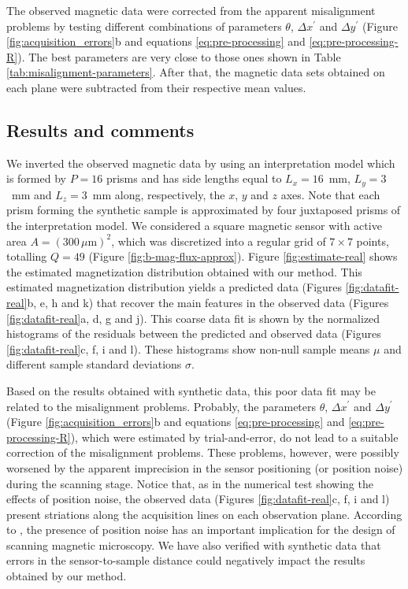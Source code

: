 \documentclass[galley,gc]{agutex}
\begin{document}
\begin{article}
The observed magnetic data were corrected from the apparent misalignment 
problems by testing different combinations of parameters $\theta$, 
$\Delta x^{\prime}$ and $\Delta y^{\prime}$ 
(Figure \ref{fig:acquisition_errors}b and equations \ref{eq:pre-processing} 
and \ref{eq:pre-processing-R}). The best parameters are very close to 
those ones shown in Table \ref{tab:misalignment-parameters}. After that, 
the magnetic data sets obtained on each plane were subtracted from their 
respective mean values.

\subsection{Results and comments}
\label{subsec:Results and comments}

We inverted the observed magnetic data by using an
interpretation model which is formed by $P = 16$ prisms
and has side lengths equal to $L_{x} = 16$~mm, $L_{y} = 3$~mm 
and $L_{z} = 3$~mm along, respectively, the $x$, $y$ and 
$z$ axes.
Note that each prism forming the synthetic sample is 
approximated by four juxtaposed prisms of the 
interpretation model.
We considered a square magnetic sensor with active area  
$A = (300 \, \mu \text{m})^{2}$, which was discretized into
a regular grid of $7 \times 7$ points, totalling $Q = 49$
(Figure \ref{fig:b-mag-flux-approx}).
Figure \ref{fig:estimate-real} shows the estimated
magnetization distribution obtained with our method.
This estimated magnetization distribution yields a predicted data
(Figures \ref{fig:datafit-real}b, e, h and k) that recover
the main features in the observed data (Figures \ref{fig:datafit-real}a, 
d, g and j).
This coarse data fit is shown by the normalized histograms of 
the residuals between the predicted and
observed data (Figures \ref{fig:datafit-real}c, f, i and l).
These histograms show non-null sample means $\mu$ and 
different sample standard deviations $\sigma$.

Based on the results obtained with synthetic data,
this poor data fit may be related to the misalignment problems.
Probably, the parameters $\theta$, $\Delta x^{\prime}$ and 
$\Delta y^{\prime}$ (Figure \ref{fig:acquisition_errors}b and 
equations \ref{eq:pre-processing} and \ref{eq:pre-processing-R}),
which were estimated by trial-and-error, do not lead to a suitable
correction of the misalignment problems.
These problems, however, were possibly worsened by the
apparent imprecision in the sensor positioning (or position noise)
during the scanning stage.
Notice that, as in the numerical test showing the effects of
position noise, the observed data (Figures \ref{fig:datafit-real}c, f, i and l)
present striations along the acquisition lines on each
observation plane.
According to \citet{lee2004}, the presence of position noise has 
an important implication for the design of scanning magnetic microscopy.
We have also verified with synthetic data that errors in the 
sensor-to-sample distance could negatively impact the results obtained
by our method.


\end{article}
\end{document}
